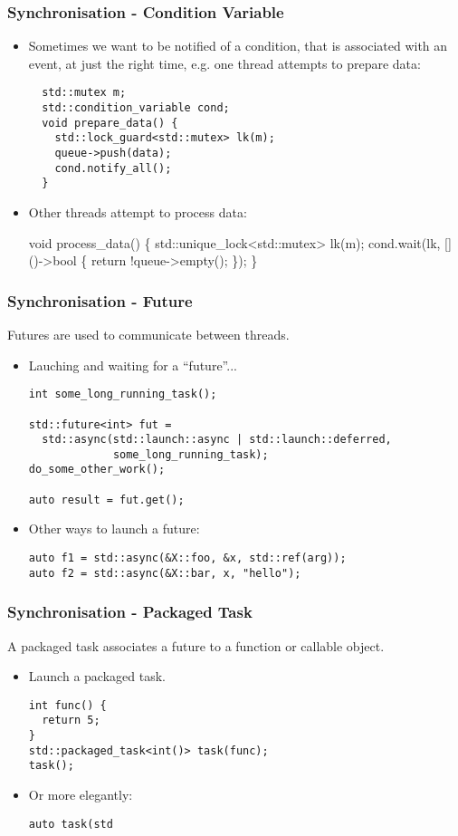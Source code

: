 \documentclass{beamer}
\begin{document}
\begin{frame}[fragile]
  \frametitle{Synchronisation - Condition Variable}
\begin{itemize}
\item
  Sometimes we want to be notified of a condition, that is associated with an event, at just the right time, e.g. one thread attempts to prepare data:
  \pause
      {\scriptsize
\begin{verbatim}
  std::mutex m;
  std::condition_variable cond;
  void prepare_data() {
    std::lock_guard<std::mutex> lk(m);
    queue->push(data);
    cond.notify_all();
  }
\end{verbatim}
}
\pause
\item Other threads attempt to process data:
{\scriptsize
\begin{semiverbatim}
  void process_data() \{
    std::{\color{red}unique_lock}<std::mutex> lk(m);
    cond.wait(lk, []()->bool \{ return !queue->empty(); \});
  \}
\end{semiverbatim}
}
\end{itemize}
\end{frame}

\begin{frame}[fragile]
\frametitle{Synchronisation - Future}
Futures are used to communicate between threads.
\begin{itemize}
\item Lauching and waiting for a ``future''...
{\scriptsize
\begin{verbatim}
int some_long_running_task();

std::future<int> fut =
  std::async(std::launch::async | std::launch::deferred,
             some_long_running_task);
do_some_other_work();

auto result = fut.get();
\end{verbatim}
}
\item Other ways to launch a future:
{\scriptsize
\begin{verbatim}
auto f1 = std::async(&X::foo, &x, std::ref(arg));
auto f2 = std::async(&X::bar, x, "hello");
\end{verbatim}
}
\end{itemize}
\end{frame}

\begin{frame}[fragile]
\frametitle{Synchronisation - Packaged Task}
A packaged task associates a future to a function or callable object.
\begin{itemize}
\item Launch a packaged task.
{\scriptsize
\begin{verbatim}
int func() {
  return 5;
}
std::packaged_task<int()> task(func);
task();
\end{verbatim}
}
\item Or more elegantly:
{\scriptsize
\begin{verbatim}
auto task(std
\end{verbatim}
}
\end{itemize}
\end{frame}
\end{document}
